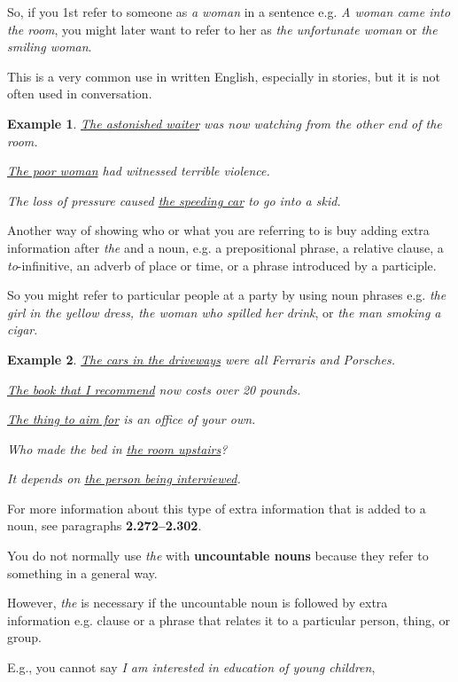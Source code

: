 \documentclass[oneside]{book}
\numberwithin{equation}{section}
\newtheorem{example}{Example}[section]
\begin{document}
So, if you 1st refer to someone as \textit{a woman} in a sentence e.g. \textit{A woman came into the room}, you might later want to refer to her as \textit{the unfortunate woman} or \textit{the smiling woman}.

%
This is a very common use in written English, especially in stories, but it is not often used in conversation.
\begin{example}
    \underline{The astonished waiter} was now watching from the other end of the room.
    
    \underline{The poor woman} had witnessed terrible violence.
    
    The loss of pressure caused \underline{the speeding car} to go into a skid.
\end{example}
%
\noindent{} Another way of showing who or what you are referring to is buy adding extra information after \textit{the} and a noun, e.g. a prepositional phrase, a relative clause, a \textit{to}-infinitive, an adverb of place or time, or a phrase introduced by a participle.

%
So you might refer to particular people at a party by using noun phrases e.g. \textit{the girl in the yellow dress, the woman who spilled her drink}, or \textit{the man smoking a cigar}.
\begin{example}
    \underline{The cars in the driveways} were all Ferraris and Porsches.
    
    \underline{The book that I recommend} now costs over 20 pounds.
    
    \underline{The thing to aim for} is an office of your own.
    
    Who made the bed in \underline{the room upstairs}?
    
    It depends on \underline{the person being interviewed}.
\end{example}
For more information about this type of extra information that is added to a noun, see paragraphs \textbf{2.272--2.302}.

%
\noindent{} You do not normally use \textit{the} with \textbf{uncountable nouns} because they refer to something in a general way.

However, \textit{the} is necessary if the uncountable noun is followed by extra information e.g. clause or a phrase that relates it to a particular person, thing, or group.

%
E.g., you cannot say \textit{I am interested in education of young children},
\end{document}
